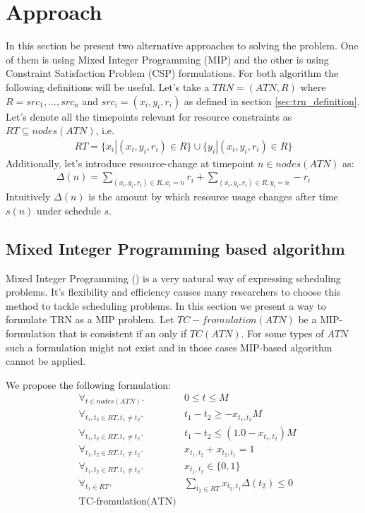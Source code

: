 \section{Approach}
In this section be present two alternative approaches to solving the problem. One of them is using Mixed Integer Programming (MIP) and the other is using Constraint Satisfaction Problem (CSP) formulations. For both algorithm the following definitions will be useful.
Let's take a $TRN=(ATN, R)$ where $R={src_1, ..., src_n}$ and $src_i = (x_i, y_i, r_i)$ as defined in section \ref{sec:trn_definition}. Let's denote all the timepoints relevant for resource constraints as $RT \subseteq nodes(ATN)$, i.e.
\begin{align*}
RT = \{ x_i | (x_i, y_i, r_i) \in R \} \cup \{ y_i | (x_i, y_i, r_i) \in R \}
\end{align*}
Additionally, let's introduce resource-change at timepoint $n \in nodes(ATN)$ as:
\begin{align*}
\Delta(n) = \sum_{(x_i, y_i, r_i) \in R, x_i = n} r_i + \sum_{(x_i, y_i, r_i) \in R, y_i = n} -r_i
\end{align*}
Intuitively $\Delta(n)$ is the amount by which resource usage changes after time $s(n)$ under schedule $s$.
\subsection{Mixed Integer Programming based algorithm}
Mixed Integer Programming (\cite{markowitz1957solution}) is a very natural way of expressing scheduling problems. It's flexibility and efficiency causes many researchers to choose this method to tackle scheduling problems. In this section we present a way to formulate TRN as a MIP problem.  Let $TC-fromulation(ATN)$ be a MIP-formulation that is consistent if an only if $TC(ATN)$. For some types of $ATN$ such a formulation might not exist and in those cases MIP-based algorithm cannot be applied.

We propose the following formulation:
\begin{align}
\label{eq:mip0} & \forall_{t \in nodes(ATN)}.              & 0 \leq t \leq M \\
\label{eq:mip1} & \forall_{t_1, t_2 \in RT, t_1 \neq t_2}. & t_1 - t_2 \geq - x_{t_1,t_2} M \\
\label{eq:mip2} & \forall_{t_1, t_2 \in RT, t_1 \neq t_2}. & t_1 - t_2 \leq (1.0 - x_{t_1,t_2}) M\\
\label{eq:mip3} & \forall_{t_1, t_2 \in RT, t_1 \neq t_2}. & x_{t_1,t_2} + x_{t_2,t_1}  = 1\\
\label{eq:mip4} & \forall_{t_1, t_2 \in RT, t_1 \neq t_2}. & x_{t_1,t_2} \in \{ 0, 1 \} \\
\label{eq:mip5} & \forall_{t_1 \in RT}.                    & \sum_{t_2 \in RT} x_{t_2, t_1} \Delta(t_2) \leq 0\\
\label{eq:mip6} & \text{TC-fromulation(ATN)}
\end{align}

